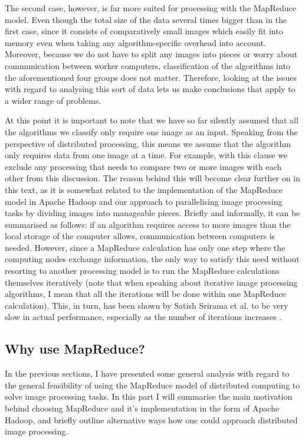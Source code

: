 \documentclass [12pt,a4paper]{report}
\begin{document}
The second case, however, is far more suited for processing with the MapReduce model. Even though the total size of the data several times bigger than in the first case, since it consists of comparatively small images which easily fit into memory even when taking any algorithm-specific overhead into account. Moreover, because we do not have to split any images into pieces or worry about communication between worker computers, classification of the algorithms into the aforementioned four groups does not matter. Therefore, looking at the issues with regard to analysing this sort of data lets us make conclusions that apply to a wider range of problems. 

At this point it is important to note that we have so far silently assumed that all the algorithms we classify only require one image as an input. Speaking from the perspective of distributed processing, this means we assume that the algorithm only requires data from one image at a time. For example, with this clause we exclude any processing that needs to compare two or more images with each other from this discussion. The reason behind this will become clear further on in this text, as it is somewhat related to the implementation of the MapReduce model in Apache Hadoop and our approach to parallelising image processing tasks by dividing images into manageable pieces. Briefly and informally, it can be summarised as follows: if an algorithm requires access to more images than the local storage of the computer allows, communication between computers is needed. However, since a MapReduce calculation has only one step where the computing nodes exchange information, the only way to satisfy this need without resorting to another processing model is to run the MapReduce calculations themselves iteratively (note that when speaking about iterative image processing algorithms, I mean that all the iterations will be done within one MapReduce calculation). This, in turn, has been shown by Satish Srirama et al. to be very slow in actual performance, especially as the number of iterations increases \cite{srirama2012adapting}.

\subsection{Why use MapReduce?}

In the previous sections, I have presented some general analysis with regard to the general feasibility of using the MapReduce model of distributed computing to solve image processing tasks. In this part I will summarise the main motivation behind choosing MapReduce and it's implementation in the form of Apache Hadoop, and briefly outline alternative ways how one could approach distributed image processing.
\end{document}
